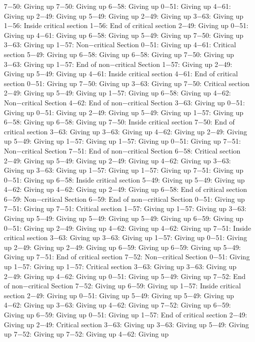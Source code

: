 7−50: Giving up
7−50: Giving up
6−58: Giving up
0−51: Giving up
4−61: Giving up
2−49: Giving up
5−49: Giving up
2−49: Giving up
3−63: Giving up
1−56: Inside critical section
1−56: End of critical section
2−49: Giving up
0−51: Giving up
4−61: Giving up
6−58: Giving up
5−49: Giving up
7−50: Giving up
3−63: Giving up
1−57: Non−critical Section
0−51: Giving up
4−61: Critical section
5−49: Giving up
6−58: Giving up
6−58: Giving up
7−50: Giving up
3−63: Giving up
1−57: End of non−critical Section
1−57: Giving up
2−49: Giving up
5−49: Giving up
4−61: Inside critical section
4−61: End of critical section
0−51: Giving up
7−50: Giving up
3−63: Giving up
7−50: Critical section
2−49: Giving up
5−49: Giving up
1−57: Giving up
6−58: Giving up
4−62: Non−critical Section
4−62: End of non−critical Section
3−63: Giving up
0−51: Giving up
0−51: Giving up
2−49: Giving up
5−49: Giving up
1−57: Giving up
6−58: Giving up
6−58: Giving up
7−50: Inside critical section
7−50: End of critical section
3−63: Giving up
3−63: Giving up
4−62: Giving up
2−49: Giving up
5−49: Giving up
1−57: Giving up
1−57: Giving up
0−51: Giving up
7−51: Non−critical Section
7−51: End of non−critical Section
6−58: Critical section
2−49: Giving up
5−49: Giving up
2−49: Giving up
4−62: Giving up
3−63: Giving up
3−63: Giving up
1−57: Giving up
1−57: Giving up
7−51: Giving up
0−51: Giving up
6−58: Inside critical section
5−49: Giving up
5−49: Giving up
4−62: Giving up
4−62: Giving up
2−49: Giving up
6−58: End of critical section
6−59: Non−critical Section
6−59: End of non−critical Section
0−51: Giving up
7−51: Giving up
7−51: Critical section
1−57: Giving up
1−57: Giving up
3−63: Giving up
5−49: Giving up
5−49: Giving up
5−49: Giving up
6−59: Giving up
0−51: Giving up
2−49: Giving up
4−62: Giving up
4−62: Giving up
7−51: Inside critical section
3−63: Giving up
3−63: Giving up
1−57: Giving up
0−51: Giving up
2−49: Giving up
2−49: Giving up
6−59: Giving up
6−59: Giving up
5−49: Giving up
7−51: End of critical section
7−52: Non−critical Section
0−51: Giving up
1−57: Giving up
1−57: Critical section
3−63: Giving up
3−63: Giving up
2−49: Giving up
4−62: Giving up
0−51: Giving up
5−49: Giving up
7−52: End of non−critical Section
7−52: Giving up
6−59: Giving up
1−57: Inside critical section
2−49: Giving up
0−51: Giving up
5−49: Giving up
5−49: Giving up
4−62: Giving up
3−63: Giving up
4−62: Giving up
7−52: Giving up
6−59: Giving up
6−59: Giving up
0−51: Giving up
1−57: End of critical section
2−49: Giving up
2−49: Critical section
3−63: Giving up
3−63: Giving up
5−49: Giving up
7−52: Giving up
7−52: Giving up
4−62: Giving up
